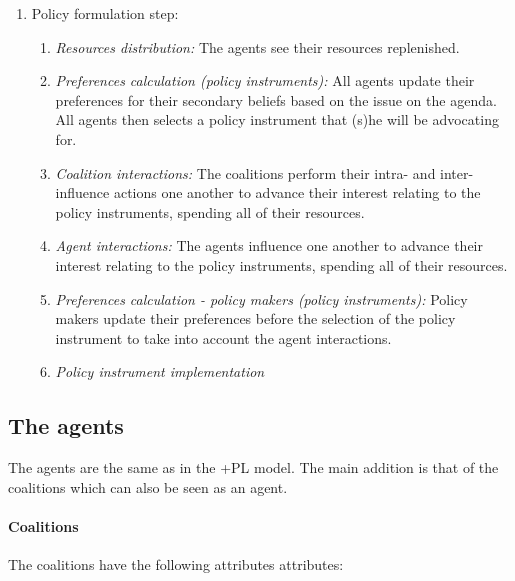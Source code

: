 \documentclass[11pt]{article}
\begin{document}
\begin{enumerate}
\item Policy formulation step:
	\begin{enumerate}
	\item \emph{Resources distribution:} The agents see their resources replenished.
	\item \emph{Preferences calculation (policy instruments):} All agents update their preferences for their secondary beliefs based on the issue on the agenda. All agents then selects a policy instrument that (s)he will be advocating for.
	\item \emph{Coalition interactions:} The coalitions perform their intra- and inter-influence actions one another to advance their interest relating to the policy instruments, spending all of their resources.
	\item \emph{Agent interactions:} The agents influence one another to advance their interest relating to the policy instruments, spending all of their resources.
	\item \emph{Preferences calculation - policy makers (policy instruments):} Policy makers update their preferences before the selection of the policy instrument to take into account the agent interactions.
	\item \emph{Policy instrument implementation} 
	\end{enumerate}

\end{enumerate}


\subsection{The agents}

The agents are the same as in the +PL model. The main addition is that of the coalitions which can also be seen as an agent.

\paragraph{Coalitions}

The coalitions have the following attributes attributes:
\end{document}
